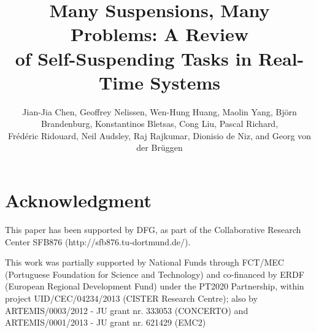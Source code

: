 \documentclass[runningheads,a4paper]{llncs}
\begin{document}
\title{Many Suspensions, Many Problems:
A Review \\
 of Self-Suspending Tasks in Real-Time Systems}
\author{Jian-Jia Chen, Geoffrey Nelissen, Wen-Hung
  Huang, Maolin Yang, Bj\"orn Brandenburg,
  Konstantinos Bletsas, Cong Liu, Pascal
  Richard, \\Fr\'ed\'eric Ridouard, Neil
  Audsley,  
Raj Rajkumar,
 Dionisio de Niz, and
Georg von der Br\"uggen}

\maketitle  
 
 









\section*{Acknowledgment}

This paper has been supported by DFG, as part of the Collaborative
Research Center SFB876 (http://sfb876.tu-dortmund.de/).

This work was partially supported by National Funds through FCT/MEC (Portuguese Foundation for Science and Technology) and co-financed by ERDF (European Regional Development Fund) under the PT2020 Partnership, within project UID/CEC/04234/2013 (CISTER Research Centre); also by ARTEMIS/0003/2012 - JU grant nr. 333053 (CONCERTO) and ARTEMIS/0001/2013 - JU grant nr. 621429 (EMC2)
\end{document}
